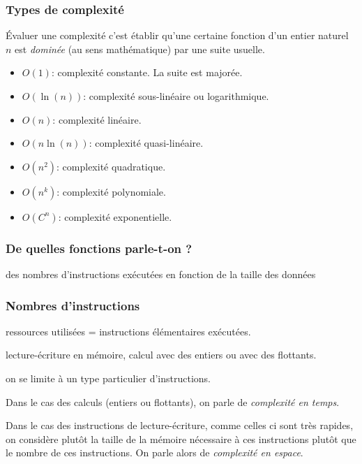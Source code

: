 


\begin{frame}
  \frametitle{Types de complexité}
\'Evaluer une complexité c'est établir qu'une certaine fonction d'un entier naturel $n$ est \emph{dominée} (au sens mathématique) par une suite usuelle.
\begin{itemize}
  \item $O(1)$: complexité constante. La suite est majorée. 
  \item $O(\ln(n))$: complexité sous-linéaire ou logarithmique.
  \item $O(n)$: complexité linéaire.
  \item $O(n\ln(n))$: complexité quasi-linéaire.
  \item $O(n^2)$: complexité quadratique.
  \item $O(n^k)$: complexité polynomiale.
  \item $O(C^n)$: complexité exponentielle.
\end{itemize}
\end{frame}

\begin{frame}
  \frametitle{De quelles fonctions parle-t-on ?}
des nombres d'instructions exécutées en fonction de la taille des données  
\end{frame}

\begin{frame}
  \frametitle{Nombres d'instructions}
ressources utilisées = instructions élémentaires exécutées.

lecture-écriture en mémoire, calcul avec des entiers ou avec des flottants.

on se limite à un type particulier d'instructions.

Dans le cas des calculs (entiers ou flottants), on parle de \emph{complexité en temps}.

Dans le cas des instructions de lecture-écriture, comme celles ci sont très rapides, on considère plutôt la taille de la mémoire nécessaire à ces instructions plutôt que le nombre de ces instructions. On parle alors de \emph{complexité en espace}.
\end{frame}

